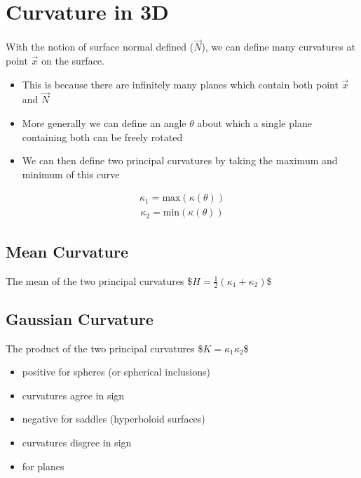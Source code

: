 \documentclass[letterpaper,10pt,english]{sphinxmanual}
\begin{document}
\section{Curvature in 3D}
\label{\detokenize{06-AdvancedShapeAndTexture:curvature-in-3d}}
\sphinxAtStartPar
With the notion of surface normal defined (\(\vec{N}\)), we can define many curvatures at point \(\vec{x}\) on the surface.
\begin{itemize}
\item {} 
\sphinxAtStartPar
This is because there are infinitely many planes which contain both point \(\vec{x}\) and \(\vec{N}\)

\item {} 
\sphinxAtStartPar
More generally we can define an angle \(\theta\) about which a single plane containing both can be freely rotated

\item {} 
\sphinxAtStartPar
We can then define two principal curvatures by taking the maximum and minimum of this curve

\end{itemize}
\begin{equation*}
\begin{split} \kappa_1 = \textrm{max}(\kappa(\theta)) \end{split}
\end{equation*}\begin{equation*}
\begin{split} \kappa_2 = \textrm{min}(\kappa(\theta)) \end{split}
\end{equation*}

\subsection{Mean Curvature}
\label{\detokenize{06-AdvancedShapeAndTexture:mean-curvature}}
\sphinxAtStartPar
The mean of the two principal curvatures
\$\( H = \frac{1}{2}(\kappa_1+\kappa_2) \)\$


\subsection{Gaussian Curvature}
\label{\detokenize{06-AdvancedShapeAndTexture:gaussian-curvature}}
\sphinxAtStartPar
The product of the two principal curvatures
\$\( K = \kappa_1\kappa_2 \)\$
\begin{itemize}
\item {} 
\sphinxAtStartPar
positive for spheres (or spherical inclusions)

\item {} 
\sphinxAtStartPar
curvatures agree in sign

\item {} 
\sphinxAtStartPar
negative for saddles (hyperboloid surfaces)

\item {} 
\sphinxAtStartPar
curvatures disgree in sign

\item {} 
 for planes

\end{itemize}
\end{document}
